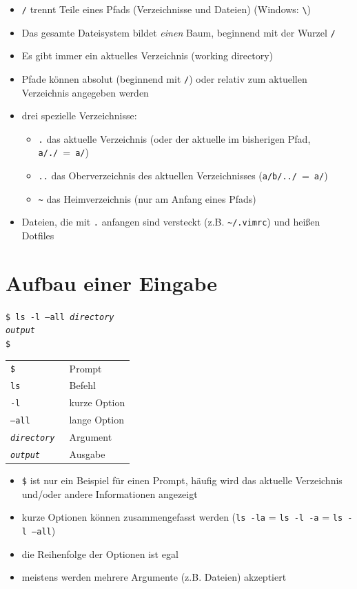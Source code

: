 \begin{itemize}
  \item \texttt{/} trennt Teile eines Pfads (Verzeichnisse und Dateien) (Windows: \texttt{\textbackslash})
  \item Das gesamte Dateisystem bildet \emph{einen} Baum, beginnend mit der Wurzel \texttt{/}
  \item Es gibt immer ein aktuelles Verzeichnis (working directory)
  \item Pfade können absolut (beginnend mit \texttt{/}) oder relativ zum aktuellen Verzeichnis angegeben werden
  \item drei spezielle Verzeichnisse:
    \begin{itemize}
      \item \texttt{.} das aktuelle Verzeichnis (oder der aktuelle im bisherigen Pfad, \texttt{a/./}~=~\texttt{a/})
      \item \texttt{..} das Oberverzeichnis des aktuellen Verzeichnisses (\texttt{a/b/../}~=~\texttt{a/})
      \item \texttt{\textasciitilde} das Heimverzeichnis (nur am Anfang eines Pfads)
    \end{itemize}
  \item Dateien, die mit \texttt{.} anfangen sind versteckt (z.B. \texttt{\textasciitilde/.vimrc}) und heißen Dotfiles
\end{itemize}

\section{Aufbau einer Eingabe}
\texttt{\$ ls -l --all \textit{directory}\\
        \textit{output}\\
        \$}
\begin{center}
  \begin{tabular}{>{\tt}l l}
    \toprule
    \$                 & Prompt       \\
    ls                 & Befehl       \\
    -l                 & kurze Option \\
    --all              & lange Option \\
    \textit{directory} & Argument     \\
    \textit{output}    & Ausgabe      \\
    \bottomrule
  \end{tabular}
\end{center}
\begin{itemize}
  \item \texttt{\$} ist nur ein Beispiel für einen Prompt, häufig wird das aktuelle Verzeichnis und/oder andere Informationen angezeigt
  \item kurze Optionen können zusammengefasst werden (\texttt{ls~-la} = \texttt{ls -l -a} = \texttt{ls -l --all})
  \item die Reihenfolge der Optionen ist egal
  \item meistens werden mehrere Argumente (z.B. Dateien) akzeptiert
\end{itemize}

